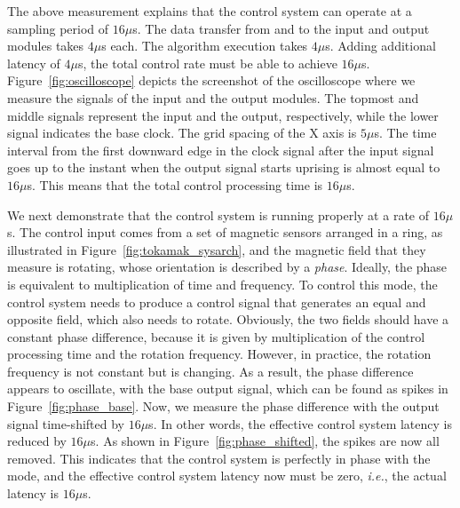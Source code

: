 The above measurement explains that the control system can operate at a
sampling period of $16\mu$s.
The data transfer from and to the input and output modules takes $4\mu$s
each.
The algorithm execution takes $4\mu$s.
Adding additional latency of $4\mu$s, the total control rate must be
able to achieve $16\mu$s.
Figure~\ref{fig:oscilloscope} depicts the screenshot of the oscilloscope
where we measure the signals of the input and the output modules.
The topmost and middle signals represent the input and the output,
respectively, while the lower signal indicates the base clock.
The grid spacing of the X axis is $5\mu$s.
The time interval from the first downward edge in the clock signal after
the input signal goes up to the instant when the output signal starts
uprising is almost equal to $16\mu$s.
This means that the total control processing time is $16\mu$s. 

We next demonstrate that the control system is running properly at a
rate of $16\mu$s.
The control input comes from a set of magnetic sensors arranged in a
ring, as illustrated in Figure~\ref{fig:tokamak_sysarch}, and the
magnetic field that they measure is rotating, whose orientation is
described by a \textit{phase}.
Ideally, the phase is equivalent to multiplication of time and
frequency.
To control this mode, the control system needs to produce a control
signal that generates an equal and opposite field, which also needs to
rotate.
Obviously, the two fields should have a constant phase difference,
because it is given by multiplication of the control processing time and
the rotation frequency.
However, in practice, the rotation frequency is not constant but is
changing.
As a result, the phase difference appears to oscillate, with the base
output signal, which can be found as spikes in
Figure~\ref{fig:phase_base}.
Now, we measure the phase difference with the output signal time-shifted
by $16\mu$s.
In other words, the effective control system latency is reduced by
$16\mu$s.
As shown in Figure~\ref{fig:phase_shifted}, the spikes are now all
removed.
This indicates that the control system is perfectly in phase with the
mode, and the effective control system latency now must be zero,
\textit{i.e.}, the actual latency is $16\mu$s.

